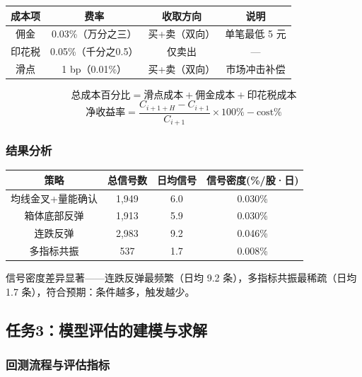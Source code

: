 \documentclass[12pt,a4paper]{ctexart}
\numberwithin{figure}{section}
\numberwithin{table}{section}
\begin{document}
{\small
\begin{center}
\begin{tabular}{cccc}
\toprule
成本项 & 费率 & 收取方向 & 说明 \\
\midrule
佣金 & 0.03\%（万分之三） & 买+卖（双向） & 单笔最低 5 元 \\
印花税 & 0.05\%（千分之0.5） & 仅卖出 & — \\
滑点 & 1 bp（0.01\%） & 买+卖（双向） & 市场冲击补偿 \\
\bottomrule
\end{tabular}
\end{center}
}

\begin{equation}
    \text{总成本百分比} = \text{滑点成本} + \text{佣金成本} + \text{印花税成本}
\end{equation}
\begin{equation}
    \text{净收益率} = \frac{C_{i+1+H} - C_{i+1}}{C_{i+1}} \times 100\% - \text{cost}\%
\end{equation}

\subsubsection{结果分析}

\begin{center}
\begin{tabular}{cccc}
\toprule
策略 & 总信号数 & 日均信号 & 信号密度(\%/股·日) \\
\midrule
均线金叉+量能确认 & 1,949 & 6.0 & 0.030\% \\
箱体底部反弹 & 1,913 & 5.9 & 0.030\% \\
连跌反弹 & 2,983 & 9.2 & 0.046\% \\
多指标共振 & 537 & 1.7 & 0.008\% \\
\bottomrule
\end{tabular}
\end{center}

信号密度差异显著——连跌反弹最频繁（日均 9.2 条），多指标共振最稀疏（日均 1.7 条），符合预期：条件越多，触发越少。

\subsection{任务3：模型评估的建模与求解}

\subsubsection{回测流程与评估指标}
\end{document}
